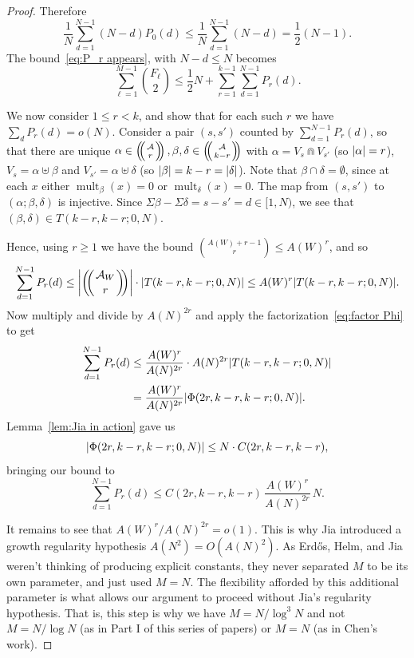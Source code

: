 \documentclass[10pt,letterpaper]{article}
\newcommand{\cA}{\mathcal{A}}
\DeclarePairedDelimiter{\abs}{\lvert}{\rvert}
\newcommand{\multibinom}[2]{\left(\kern-0.3em\left(\genfrac{}{}{0pt}{}{#1}{#2}\right)\kern-0.3em\right)}
\DeclareMathOperator{\mult}{mult}
\theoremstyle{remark}
\begin{document}
\begin{proof}
Therefore
\begin{equation}\label{eq:disjoint}
   \frac1N \sum_{d=1}^{N-1}(N-d) P_0(d) \le \frac 1N \sum_{d=1}^{N-1}(N-d) = \frac12 (N-1).
\end{equation}
The bound~\eqref{eq:P_r appears}, with $N-d \le N$ becomes
  \begin{equation}\label{eq:P_0 is gone}
    \sum_{\ell=1}^{M-1}\binom{F_\ell}{2}
    \le \frac12 N + \sum_{r=1}^{k-1} \sum_{d=1}^{N-1} P_r(d).
  \end{equation}

We now consider $1 \le r < k$, and show that for each such $r$ we have $\sum_d P_r(d)=o(N)$.  
Consider a pair $(s,s')$ counted by $\sum_{d=1}^{N-1} P_r(d)$, so that there are unique $\alpha\in \multibinom{\cA}{r}, \beta,\delta \in \multibinom{\cA}{k-r}$ with $\alpha =V_s \Cap V_{s'}$ (so $\abs{\alpha}=r$), $V_s = \alpha \uplus \beta$ and $V_{s'} = \alpha \uplus \delta$ (so $\abs{\beta}=k-r = \abs{\delta}$). 
Note that $\beta \cap \delta = \emptyset$, since at each $x$ either $\mult_\beta(x)=0$ or $\mult_\delta(x)=0$.
The map from $(s,s')$ to $(\alpha;\beta,\delta)$ is injective. 
Since $\Sigma \beta -\Sigma\delta =s-s' =d \in [1,N)$, we see that $(\beta,\delta) \in T(k-r,k-r;0,N)$.

Hence, using $r\ge 1$ we have the bound $\binom{A(W)+r-1}{r}\le A(W)^{r}$, and so
\[
   \sum_{d=1}^{N-1}P_r(d)
   \le \abs*{\multibinom{\cA_W}{r}}\cdot\abs*{T(k-r,k-r;0,N)}
   \le A(W)^{r} \abs*{T(k-r,k-r;0,N)}.
\]
Now multiply and divide by $A(N)^{2r}$ and apply the factorization~\eqref{eq:factor Phi} to get
\begin{align*}
   \sum_{d=1}^{N-1}P_r(d)
   &\le\frac{A(W)^{r}}{A(N)^{2r}}\cdot A(N)^{2r} \abs*{T(k-r,k-r;0,N)}\\
   &=\frac{A(W)^{r}}{A(N)^{2r}} \abs*{\Phi(2r,k-r,k-r;0,N)}.
\end{align*}
Lemma~\ref{lem:Jia in action} gave us
\[
   \abs*{\Phi(2r,k-r,k-r;0,N)}\le N \cdot C(2r,k-r,k-r),
\]
bringing our bound to
  \[\sum_{d=1}^{N-1} P_r(d) \le  C(2r,k-r,k-r) \, \frac{A(W)^{r}}{A(N)^{2r}}\,  N.\]


It remains to see that $A(W)^r/A(N)^{2r}=o(1)$. This is why Jia introduced a growth regularity hypothesis $A(N^2) = O(A(N)^2)$. As Erd\H{o}s, Helm, and Jia weren't thinking of producing explicit constants, they never separated $M$ to be its own parameter, and just used $M=N$. The flexibility afforded by this additional parameter is what allows our argument to proceed without Jia's regularity hypothesis. That is, this step is why we have $M=N/\log^3 N$ and not $M=N/\log N$ (as in Part I of this series of papers) or $M=N$ (as in Chen's work).


\end{proof}
\end{document}
